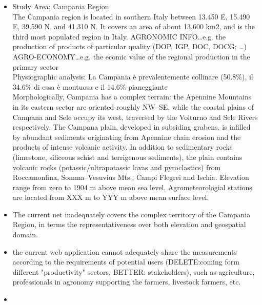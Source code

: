 \documentclass[authoryear,preprint,review,12pt]{elsarticle}
\begin{document}
\begin{itemize}
    \item Study Area: Campania Region\\
    The Campania region is located in southern Italy between 13.450 E, 15.490 E, 39.590 N, and 41.310 N.
    It covers an area of about 13,600 km2, and is the third most populated region in Italy.
    AGRONOMIC INFO\dots e.g. the production of products of particular quality (DOP, IGP, DOC, DOCG; \dots)\\
    AGRO-ECONOMY\dots e.g. the ecomic value of the regional production in the primary sector\\
    Physiographic analysis: La Campania è prevalentemente collinare (50.8\%), il 34.6\% di essa è montuosa e il 14.6\% pianeggiante\\
    
    Morphologically, Campania has a complex terrain: the Apennine Mountains in its eastern sector are oriented roughly NW–SE, while the coastal plains of Campana and Sele occupy its west, traversed by the Volturno and Sele Rivers respectively.
    The Campana plain, developed in subsiding grabens, is infilled by abundant sediments originating from Apennine chain erosion and the products of intense volcanic activity.
    In addition to sedimentary rocks (limestone, siliceous schist and terrigenous sediments), the plain contains volcanic rocks (potassic/ultrapotassic lavas and pyroclastics) from Roccamonfina, Somma–Vesuvius Mts., Campi Flegrei and Ischia.
    Elevation range from zero to 1904 m above mean sea level.
    Agrometeorologial stations are located from XXX m to YYY m above mean surface level.
    
    \item The current net inadequately covers the complex territory of the Campania Region, in terms the representativeness over both elevation and geospatial domain.
    \item the current web application cannot adequately share the measurements according to the requirements of potential users (DELETE:coming form different "productivity" sectors, BETTER: stakeholders), such as agriculture, professionals in agronomy supporting the farmers, livestock farmers, etc.
    \item 
\end{itemize}
\end{document}

